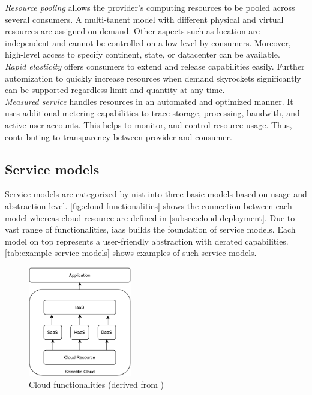 \textit{Resource pooling} allows the provider's computing resources to be pooled across several consumers. A multi-tanent model with different physical and virtual resources are assigned on demand. Other aspects such as location are independent and cannot be controlled on a low-level by consumers. Moreover, high-level access to specify continent, state, or datacenter can be available.\\

\textit{Rapid elasticity} offers consumers to extend and release capabilities easily. Further automization to quickly increase resources  when demand skyrockets significantly can be supported regardless limit and quantity at any time.\\

\textit{Measured service} handles resources in an automated and optimized manner. It uses additional metering capabilities to trace storage, processing, bandwith, and active user accounts. This helps to monitor, and control resource usage. Thus, contributing to transparency between provider and consumer.

\subsection{Service models}
\label{subsec:cloud-service}

Service models are categorized by \ac{nist} into three basic models based on usage and abstraction level. \autoref{fig:cloud-functionalities} shows the connection between each model whereas cloud resource are defined in \autoref{subsec:cloud-deployment}. Due to vast range of functionalities, \ac*{iaas} builds the foundation of service models. Each model on top represents a user-friendly abstraction with derated capabilities. \autoref{tab:example-service-models} shows examples of such service models.

\begin{figure}[h]
    \centering
    \includegraphics[width=0.4\textwidth]{figures/cloud-functionalities.pdf}
    \caption{Cloud functionalities (derived from \cite{Wang2010})}
    \label{fig:cloud-functionalities}
\end{figure}

